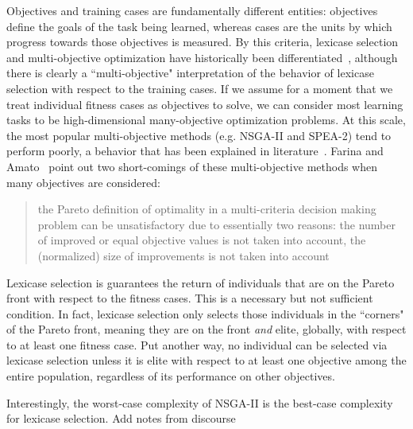 \documentclass[preprint]{article}
\begin{document}
Objectives and training cases are fundamentally different entities: objectives define the goals of the task being learned, whereas cases are the units by which progress towards those objectives is measured. By this criteria, lexicase selection and multi-objective optimization have historically been differentiated~\cite{helmuth_general_2015}, although there is clearly a ``multi-objective" interpretation of the behavior of lexicase selection with respect to the training cases. If we assume for a moment that we treat individual fitness cases as objectives to solve, we can consider most learning tasks to be high-dimensional many-objective optimization problems. At this scale, the most popular multi-objective methods (e.g. NSGA-II and SPEA-2) tend to perform poorly, a behavior that has been explained in literature~\cite{wagner_pareto-_2007, farina_optimal_2002}. Farina and Amato~\cite{farina_optimal_2002} point out two short-comings of these multi-objective methods when many objectives are considered: \begin{quote}
the Pareto definition of optimality in a multi-criteria decision making problem can be unsatisfactory due to essentially two reasons: the number of improved or equal objective values is not taken into account, the (normalized) size of improvements is not taken into account
\end{quote}

Lexicase selection is guarantees the return of individuals that are on the Pareto front with respect to the fitness cases. This is a necessary but not sufficient condition. In fact, lexicase selection only selects those individuals in the ``corners" of the Pareto front, meaning they are on the front {\it and} elite, globally, with respect to at least one fitness case. Put another way, no individual can be selected via lexicase selection unless it is elite with respect to at least one objective among the entire population, regardless of its performance on other objectives. 

Interestingly, the worst-case complexity of NSGA-II is the best-case complexity for lexicase selection. Add notes from discourse
\end{document}
